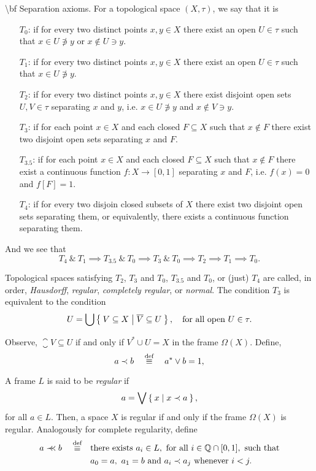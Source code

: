 \num {\bf Separation axioms.} For a topological space $(X,\tau)$, we say that it is
\begin{itemize}
    \item[$T_0$:] if for every two distinct points $x,y\in X$ there exist an open $U\in \tau$ such that $x\in U\not\ni y$ or $x\not\in U\ni y$.
    \item[$T_1$:] if for every two distinct points $x,y\in X$ there exist an open $U\in \tau$ such that $x\in U\not\ni y$.
    \item[$T_2$:] if for every two distinct points $x,y\in X$ there exist disjoint open sets $U,V\in \tau$ separating $x$ and $y$, i.e. $x\in U\not\ni y$ and $x\not\in V\ni y$.
    \item[$T_3$:] if for each point $x\in X$ and each closed $F\subseteq X$ such that $x\notin F$ there exist two disjoint open sets separating $x$ and $F$.
    \item[$T_{3.5}$:] if for each point $x\in X$ and each closed $F\subseteq X$ such that $x\notin F$ there exist a continuous function $f\colon X\to [0,1]$ separating $x$ and $F$, i.e. $f(x) = 0$ and $f[F] = 1$.
    \item[$T_{4}$:] if for every two disjoin closed subsets of $X$ there exist two disjoint open sets separating them, or equivalently, there exists a continuous function separating them.
\end{itemize}

And we see that
$$ T_4~\&~T_1 \implies T_{3.5}~\&~T_0 \implies T_3~\&~T_0 \implies T_2 \implies T_1 \implies T_0. $$

\noindent Topological spaces satisfying $T_2$, $T_3$ and $T_0$, $T_{3.5}$ and $T_0$, or (just) $T_4$ are called, in order, \emph{Hausdorff}, \emph{regular}, \emph{completely regular}, or \emph{normal}.
The condition $T_3$ is equivalent to the condition
$$U = \bigcup \Set{ V\subseteq X | \overline{V} \subseteq U},\quad\text{for all open } U\in \tau.$$

Observe, $\closure V\subseteq U$ if and only if $V^*\cup U = X$ in the frame $\Omega(X)$. Define,
$$ a\prec b\quad\stackrel{\text{def}}{\equiv}\quad a^*\vee b = 1,$$

\noindent A frame $L$ is said to be \emph{regular} if
$$ a = \bigvee \Set{ x | x\prec a},$$
\noindent for all $a\in L$. Then, a space $X$ is regular if and only if the frame $\Omega(X)$ is regular.
Analogously for complete regularity, define
\begin{align*}
    a\prec\mkern-8mu\prec b\quad\stackrel{\text{def}}{\equiv}\quad &\text{there exists } a_i\in L,\text{ for all } i\in \mathbb Q\cap [0,1],\text{ such that}\\
        & a_0 = a,~ a_1 = b\text{ and } a_i\prec a_j\text{ whenever } i<j.
\end{align*}

